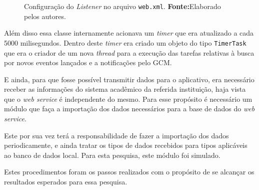 	\begin{figure}[h!]
		
		\caption[Configuração do  Listener no arquivo web.xml]{Configuração do 
		\textit{Listener} no arquivo \texttt{web.xml}.
		\textbf{Fonte:}Elaborado pelos autores.}
		\label{fig:desws34}
	\end{figure}
	
	\par Além disso essa classe internamente acionava um \textit{timer} que era
atualizado a cada 5000 milisegundos. Dentro deste \textit{timer} era criado um
objeto do tipo \texttt{TimerTask} que era o criador de um nova \textit{thread}
para a execução das tarefas relativas à busca por novos eventos lançados e a
notificações pelo GCM.
	
	\par E ainda, para que fosse possível transmitir dados para o aplicativo, era
necessário receber as informações do sistema acadêmico da referida instituição,
haja vista que o \textit{web service} é independente do mesmo. Para esse
propósito é necessário um módulo que faça a importação dos dados necessários
para a base de dados do \textit{web service}.

	\par Este por sua vez terá a responsabilidade de fazer a importação dos dados
periodicamente, e ainda tratar os tipos de dados recebidos para tipos
aplicáveis ao banco de dados local. Para esta pesquisa, este módulo foi
simulado.

	\par Estes procedimentos foram os passos realizados com o propósito de se
alcançar os resultados esperados para essa pesquisa.
